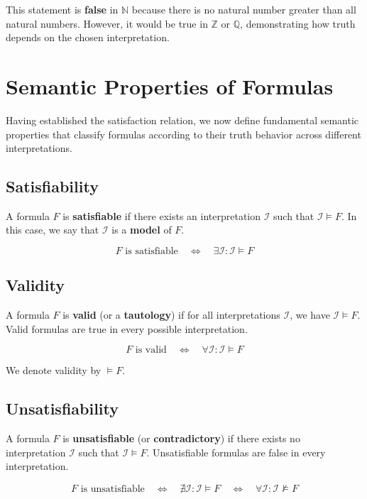 \documentclass[11pt,a4paper]{article}
\theoremstyle{definition}
\theoremstyle{plain}
\theoremstyle{remark}
\newcommand{\N}{\mathbb{N}}
\begin{document}
This statement is \textbf{false} in $\N$ because there is no natural number greater than all natural numbers. However, it would be true in $\mathbb{Z}$ or $\mathbb{Q}$, demonstrating how truth depends on the chosen interpretation.

\section{Semantic Properties of Formulas}

Having established the satisfaction relation, we now define fundamental semantic properties that classify formulas according to their truth behavior across different interpretations.

\subsection{Satisfiability}

A formula $F$ is \textbf{satisfiable} if there exists an interpretation $\mathcal{I}$ such that $\mathcal{I} \models F$. In this case, we say that $\mathcal{I}$ is a \textbf{model} of $F$.

\[
F \text{ is satisfiable} \quad \Leftrightarrow \quad \exists \mathcal{I} : \mathcal{I} \models F
\]

\subsection{Validity}

A formula $F$ is \textbf{valid} (or a \textbf{tautology}) if for all interpretations $\mathcal{I}$, we have $\mathcal{I} \models F$. Valid formulas are true in every possible interpretation.

\[
F \text{ is valid} \quad \Leftrightarrow \quad \forall \mathcal{I} : \mathcal{I} \models F
\]

We denote validity by $\models F$.

\subsection{Unsatisfiability}

A formula $F$ is \textbf{unsatisfiable} (or \textbf{contradictory}) if there exists no interpretation $\mathcal{I}$ such that $\mathcal{I} \models F$. Unsatisfiable formulas are false in every interpretation.

\[
F \text{ is unsatisfiable} \quad \Leftrightarrow \quad \nexists \mathcal{I} : \mathcal{I} \models F \quad \Leftrightarrow \quad \forall \mathcal{I} : \mathcal{I} \not\models F
\]
\end{document}
